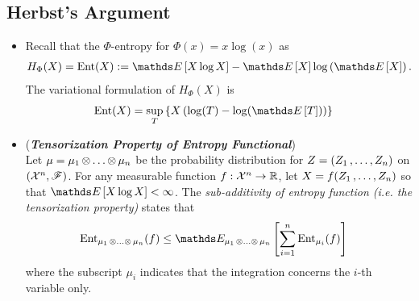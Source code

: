 \documentclass[11pt]{article}
\begin{document}
\subsection{Herbst's Argument}
\begin{itemize}
\item \begin{remark} 
Recall that the $\Phi$-entropy for $\Phi(x) = x\log(x)$ as
\begin{align*}
H_{\Phi}(X) = \text{Ent}(X)&:=  \E{}{X\log X} - \E{}{X}\log\paren{\E{}{X}}. 
\end{align*}
The variational formulation of $H_{\Phi}(X)$ is
\begin{align*}
\text{Ent}(X)&= \sup_{T}\set{X\paren{\log(T) - \log(\E{}{T})}}
\end{align*}
\end{remark}

\item \begin{remark} (\textbf{\emph{Tensorization Property of Entropy Functional}})\\
Let $\mu = \mu_1 \,{\otimes}\ldots{\otimes}\, \mu_n$ be the probability distribution for $Z = (Z_1 \,{,}\ldots{,}\, Z_n)$ on $({\mathcal X}^n, {\mathscr F})$. For any measurable function $f: {\mathcal X}^n \to {\mathbb R}$, let $X = f(Z_1 \,{,}\ldots{,}\, Z_n)$ so that $\E{}{X\log X} < \infty$.  The \emph{sub-additivity of entropy function (i.e. the tensorization property)} states that 
\begin{align*}
\text{Ent}_{\mu_1 \xdotx{\otimes} \mu_n}(f) &\le \E{\mu_1 \xdotx{\otimes} \mu_n}{\sum_{i=1}^{n}\text{Ent}_{\mu_i}(f)}
\end{align*} where the subscript $\mu_i$ indicates that the integration concerns the $i$-th variable only.
\end{remark}


\end{itemize}
\end{document}
